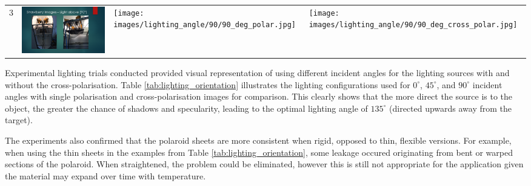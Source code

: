 \documentclass[fleqn,twoside,12pt]{report}
\begin{document}
\begin{table}[h]
\begin{tabular}{c*3{I}}
		3 &
		\includegraphics[width=\linewidth]{images/lighting_angle/90/90_degrees_setup.pdf} & \texttt{[image: images/lighting\_angle/90/90\_deg\_polar.jpg]} & \texttt{[image: images/lighting\_angle/90/90\_deg\_cross\_polar.jpg]} \\
		
	\end{tabular}
\end{table} 

Experimental lighting trials conducted provided visual representation of using different incident angles for the lighting sources with and without the cross-polarisation. Table \ref{tab:lighting_orientation} illustrates the lighting configurations used for $0^{\circ}$, $45^{\circ}$, and $90^{\circ}$ incident angles with single polarisation and cross-polarisation images for comparison. This clearly shows that the more direct the source is to the object, the greater the chance of shadows and specularity, leading to the optimal lighting angle of $135^{\circ}$ (directed upwards away from the target).


The experiments also confirmed that the polaroid sheets are more consistent when rigid, opposed to thin, flexible versions. For example, when using the thin sheets in the examples from Table \ref{tab:lighting_orientation}, some leakage occured originating from bent or warped sections of the polaroid. When straightened, the problem could be eliminated, however this is still not appropriate for the application given the material may expand over time with temperature.  
\end{document}
